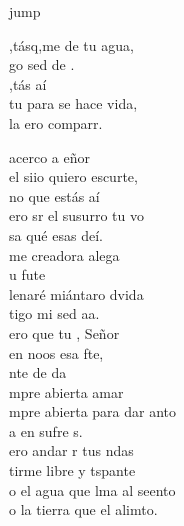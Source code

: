 \begin{cancion}jump\\
	\begin{chorus}%
		,tásq,me de tu agua, \\
		go sed de .\\
		,tás aí\\
		tu para se hace vida,\\
		la ero comparr.\jump\\
	\end{chorus}%
	acerco a eñor\\
	el siio quiero escurte,\\
	no que estás aí\\
	ero sr el susurro tu vo\\
	sa qué esas deí.\\
	me creadora  alega \\
	 u fute \\
	lenaré miántaro dvida\\
	tigo mi sed aa. \\
	\jump
	ero que tu , Señor\\
	 en noos esa fte,\\
	nte de da\\
	mpre abierta  amar\\
	mpre abierta para dar anto\\
	a en sufre s. \\
	ero andar r tus ndas\\
	tirme libre y tspante\\
	o el agua que lma al seento\\
	o la tierra que el alimto.\\
\end{cancion}%

